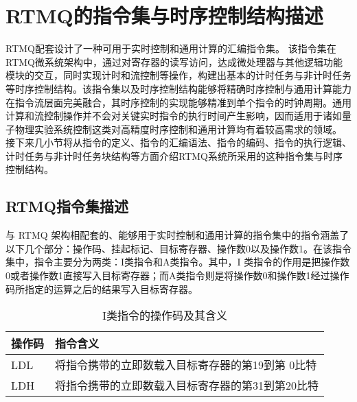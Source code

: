 \section[RTMQ的指令集与时序控制结构描述]{RTMQ的指令集与时序控制结构描述\label{section:rtmq_instructions}}
RTMQ配套设计了一种可用于实时控制和通用计算的汇编指令集\cite[]{junhua03}。
该指令集在RTMQ微系统架构中，通过对寄存器的读写访问，达成微处理器与其他逻辑功能模块的交互，同时实现计时和流控制等操作，构建出基本的计时任务与非计时任务等时序控制结构。该指令集以及时序控制结构能够将精确时序控制与通用计算能力在指令流层面完美融合，其时序控制的实现能够精准到单个指令的时钟周期。通用计算和流控制操作并不会对关键实时指令的执行时间产生影响，因而适用于诸如量子物理实验系统控制这类对高精度时序控制和通用计算均有着较高需求的领域。
接下来几小节将从指令的定义、指令的汇编语法、指令的编码、指令的执行逻辑、计时任务与非计时任务块结构等方面介绍RTMQ系统所采用的这种指令集与时序控制结构。

\subsection[RTMQ指令集描述]{RTMQ指令集描述\label{section:rtmq_instruction_set}}


与 RTMQ 架构相配套的、能够用于实时控制和通用计算的指令集中的指令涵盖了以下几个部分：操作码、挂起标记、目标寄存器、操作数0以及操作数1。在该指令集中，指令主要分为两类：I类指令和A类指令。其中，I 类指令的作用是把操作数0或者操作数1直接写入目标寄存器；而A类指令则是将操作数0和操作数1经过操作码所指定的运算之后的结果写入目标寄存器。


\begin{table}
    \centering
    \caption[I类指令的操作码及其含义]{I类指令的操作码及其含义\label{tb:i_instructions}}
    \begin{tabular}{C{2cm}|C{12cm}}
        \toprule
        操作码 & 指令含义 \\
        \midrule
        LDL & 将指令携带的立即数载入目标寄存器的第19到第 0比特\\
        LDH & 将指令携带的立即数载入目标寄存器的第31到第20比特\\
        \bottomrule
    \end{tabular}
\end{table}

